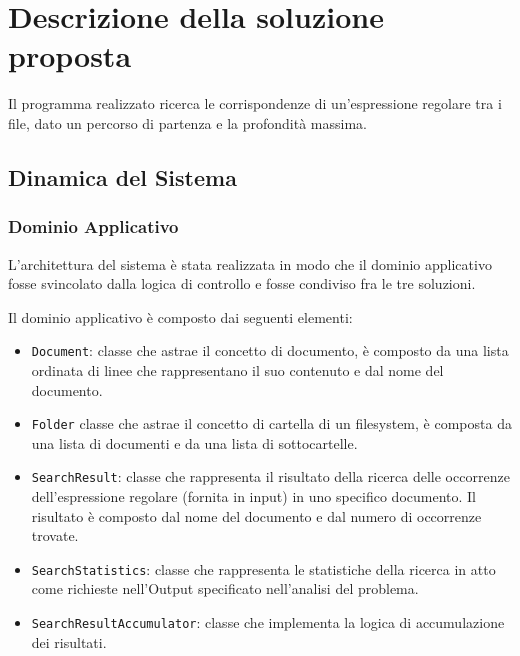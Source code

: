 \documentclass[a4paper]{article}
\begin{document}
\section{Descrizione della soluzione proposta}\label{descrizione-della-soluzione-proposta}

Il programma realizzato ricerca le corrispondenze di un'espressione regolare tra i file, dato un percorso di partenza e la profondità massima.
%

\subsection{Dinamica del Sistema}

\subsubsection{Dominio Applicativo}

L'architettura del sistema \`e stata realizzata in modo che il dominio applicativo fosse svincolato dalla logica di controllo e fosse condiviso fra le tre soluzioni.

Il dominio applicativo \`e composto dai seguenti elementi:

\begin{itemize}

    \item \texttt{Document}: classe che astrae il concetto di documento, \`e composto da una lista ordinata di linee che rappresentano il suo contenuto e dal nome del documento.

    \item \texttt{Folder} classe che astrae il concetto di cartella di un filesystem, \`e composta da una lista di documenti e da una lista di sottocartelle.

    \item \texttt{SearchResult}: classe che rappresenta il risultato della ricerca delle occorrenze dell'espressione regolare (fornita in input) in uno specifico documento.
%
Il risultato \`e composto dal nome del documento e dal numero di occorrenze trovate.

    \item \texttt{SearchStatistics}: classe che rappresenta le statistiche della ricerca in atto come richieste nell'Output specificato nell'analisi del problema.
%

    \item \texttt{SearchResultAccumulator}: classe che implementa la logica di accumulazione dei risultati.

\end{itemize}
\end{document}
